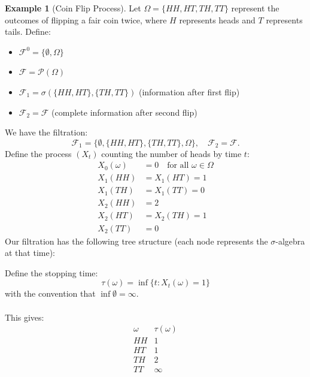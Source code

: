 \documentclass[11pt,a4paper]{article}
\theoremstyle{definition}
\newtheorem{example}{Example}[section]
\begin{document}
\begin{example}[Coin Flip Process]
Let $\Omega = \{HH, HT, TH, TT\}$ represent the outcomes of flipping a fair coin twice, where $H$ represents heads and $T$ represents tails. Define:

\begin{itemize}
    \item $\mathcal{F}^0 = \{\emptyset, \Omega\}$ 
    \item $\mathcal{F} = \mathcal{P}(\Omega) $
    \item $\mathcal{F}_1 = \sigma(\{HH, HT\}, \{TH, TT\})$ (information after first flip)
    \item $\mathcal{F}_2 = \mathcal{F}$ (complete information after second flip)
\end{itemize}
\noindent
We have the filtration:
\[
\mathcal{F}_1 = \{\emptyset, \{HH, HT\}, \{TH, TT\}, \Omega\}, \quad \mathcal{F}_2 = \mathcal{F}.
\]
Define the process $(X_t)$ counting the number of heads by time $t$:
\begin{align*}
X_0(\omega) &= 0 \quad \text{for all } \omega \in \Omega \\
X_1(HH) &= X_1(HT) = 1 \\
X_1(TH) &= X_1(TT) = 0 \\
X_2(HH) &= 2 \\
X_2(HT) &= X_2(TH) = 1 \\
X_2(TT) &= 0
\end{align*}
Our filtration has the following tree structure (each node represents the $\sigma$-algebra at that time):

\begin{center}
\end{center}
Define the stopping time:
\[
\tau(\omega) = \inf\{t : X_t(\omega) = 1\}
\]
with the convention that $\inf \emptyset = \infty$. ~\\~\\
\noindent 
This gives:
\[
\begin{array}{c|c}
\omega & \tau(\omega) \\
\hline
HH & 1 \\
HT & 1 \\
TH & 2 \\
TT & \infty
\end{array}
\]


\end{example}
\end{document}
